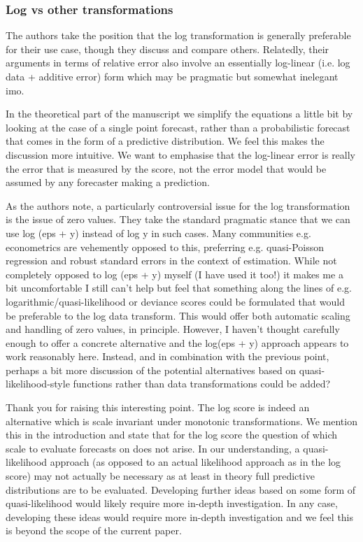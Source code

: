 \documentclass{article}
\newcommand{\black}{\color{black}}
\newcommand{\blue}{\color{blue}}
\newcommand{\notindented}{\setlength{\leftskip}{0cm}}
\begin{document}
\notindented

\blue
\subsubsection{Log vs other transformations}
The authors take the position that the log transformation is generally preferable for their use case, though they discuss and compare others. Relatedly, their arguments in terms of relative error also involve an essentially log-linear (i.e. log data + additive error) form which may be pragmatic but somewhat inelegant imo.

\black
In the theoretical part of the manuscript we simplify the equations a little bit by looking at the case of a single point forecast, rather than a probabilistic forecast that comes in the form of a predictive distribution. We feel this makes the discussion more intuitive. We want to emphasise that the log-linear error is really the error that is measured by the score, not the error model that would be assumed by any forecaster making a prediction. 


\blue
As the authors note, a particularly controversial issue for the log transformation is the issue of zero values. They take the standard pragmatic stance that we can use log (eps + y) instead of log y in such cases. Many communities e.g. econometrics are vehemently opposed to this, preferring e.g. quasi-Poisson regression and robust standard errors in the context of estimation. While not completely opposed to log (eps + y) myself (I have used it too!) it makes me a bit uncomfortable I still can’t help but feel that something along the lines of e.g. logarithmic/quasi-likelihood or deviance scores could be formulated that would be preferable to the log data transform. This would offer both automatic scaling and handling of zero values, in principle. However, I haven’t thought carefully enough to offer a concrete alternative and the log(eps + y) approach appears to work reasonably here. Instead, and in combination with the previous point, perhaps a bit more discussion of the potential alternatives based on quasi-likelihood-style functions rather than data transformations could be added?

\black
Thank you for raising this interesting point. The log score is indeed an alternative which is scale invariant under monotonic transformations. We mention this in the introduction and state that for the log score the question of which scale to evaluate forecasts on does not arise. In our understanding, a quasi-likelihood approach (as opposed to an actual likelihood approach as in the log score) may not actually be necessary as at least in theory full predictive distributions are to be evaluated. Developing further ideas based on some form of quasi-likelihood would likely require more in-depth investigation. In any case, developing these ideas would require more in-depth investigation and we feel this is beyond the scope of the current paper. 
\end{document}
